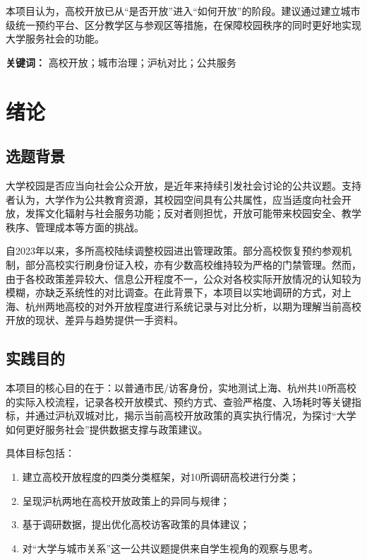 \documentclass[12pt]{article}
\begin{document}
本项目认为，高校开放已从“是否开放”进入“如何开放”的阶段。建议通过建立城市级统一预约平台、区分教学区与参观区等措施，在保障校园秩序的同时更好地实现大学服务社会的功能。

\textbf{关键词：} 高校开放；城市治理；沪杭对比；公共服务

\newpage
\tableofcontents
\newpage

\section{绪论}

\subsection{选题背景}

大学校园是否应当向社会公众开放，是近年来持续引发社会讨论的公共议题。支持者认为，大学作为公共教育资源，其校园空间具有公共属性，应当适度向社会开放，发挥文化辐射与社会服务功能；反对者则担忧，开放可能带来校园安全、教学秩序、管理成本等方面的挑战。

自2023年以来，多所高校陆续调整校园进出管理政策。部分高校恢复预约参观机制，部分高校实行刷身份证入校，亦有少数高校维持较为严格的门禁管理。然而，由于各校政策差异较大、信息公开程度不一，公众对各校实际开放情况的认知较为模糊，亦缺乏系统性的对比调查。在此背景下，本项目以实地调研的方式，对上海、杭州两地高校的对外开放程度进行系统记录与对比分析，以期为理解当前高校开放的现状、差异与趋势提供一手资料。

\subsection{实践目的}

本项目的核心目的在于：以普通市民/访客身份，实地测试上海、杭州共10所高校的实际入校流程，记录各校开放模式、预约方式、查验严格度、入场耗时等关键指标，并通过沪杭双城对比，揭示当前高校开放政策的真实执行情况，为探讨“大学如何更好服务社会”提供数据支撑与政策建议。

具体目标包括：

\begin{enumerate}[leftmargin=2em]
    \item 建立高校开放程度的四类分类框架，对10所调研高校进行分类；
    \item 呈现沪杭两地在高校开放政策上的异同与规律；
    \item 基于调研数据，提出优化高校访客政策的具体建议；
    \item 对“大学与城市关系”这一公共议题提供来自学生视角的观察与思考。
\end{enumerate}
\end{document}
